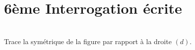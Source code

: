 


\pagestyle{empty}
\section*{6ème Interrogation écrite}

\\
Trace la symétrique de la figure par rapport à la droite $(d)$.\\
[Contenu symétrie...]
